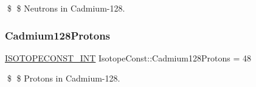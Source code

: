 \$ \$ Neutrons in Cadmium-\/128. \mbox{\label{group___isotope_const-_cadmium-_cd128_gaf98cd1c12082ffbfab35e7e8e0a6b1d8}} 
\subsubsection{\texorpdfstring{Cadmium128\+Protons}{Cadmium128Protons}}
{\footnotesize\ttfamily \mbox{\hyperlink{group___isotope_const-_macros_ga5f18360b3e99483a35c32d789e62621c}{I\+S\+O\+T\+O\+P\+E\+C\+O\+N\+S\+T\+\_\+\+I\+NT}} Isotope\+Const\+::\+Cadmium128\+Protons = 48}

\$ \$ Protons in Cadmium-\/128. 